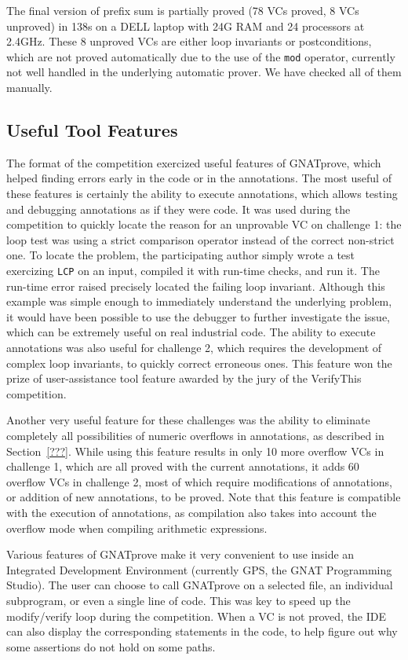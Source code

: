 \documentclass[sttt,draft]{svjour}
\newcommand{\gnatprove}{GNATprove\xspace}
\begin{document}
The final version of prefix sum is partially proved (78 VCs proved, 8 VCs
unproved) in 138s on a DELL laptop with 24G RAM and 24 processors at 2.4GHz.
These 8 unproved VCs are either loop invariants or postconditions, which are
not proved automatically due to the use of the \verb|mod| operator, currently
not well handled in the underlying automatic prover. We have checked all of
them manually.

\subsection{Useful Tool Features}

The format of the competition exercized useful features of \gnatprove, which
helped finding errors early in the code or in the annotations. The most useful
of these features is certainly the ability to execute annotations, which allows
testing and debugging annotations as if they were code. It was used during the
competition to quickly locate the reason for an unprovable VC on challenge 1:
the loop test was using a strict comparison operator instead of the correct
non-strict one. To locate the problem, the participating author simply wrote a
test exercizing \verb|LCP| on an input, compiled it with run-time checks, and
run it. The run-time error raised precisely located the failing loop
invariant. Although this example was simple enough to immediately understand
the underlying problem, it would have been possible to use the debugger to
further investigate the issue, which can be extremely useful on real industrial
code. The ability to execute annotations was also useful for challenge 2, which
requires the development of complex loop invariants, to quickly correct
erroneous ones. This feature won the prize of user-assistance tool feature
awarded by the jury of the VerifyThis competition.

Another very useful feature for these challenges was the ability to eliminate
completely all possibilities of numeric overflows in annotations, as described
in Section~\ref{???}. While using this feature results in only 10 more overflow
VCs in challenge 1, which are all proved with the current annotations, it adds
60 overflow VCs in challenge 2, most of which require modifications of
annotations, or addition of new annotations, to be proved. Note that this
feature is compatible with the execution of annotations, as compilation also
takes into account the overflow mode when compiling arithmetic expressions.

Various features of \gnatprove make it very convenient to use inside an
Integrated Development Environment (currently GPS, the GNAT Programming
Studio). The user can choose to call \gnatprove on a selected file, an
individual subprogram, or even a single line of code. This was key to speed up
the modify/verify loop during the competition. When a VC is not proved, the IDE
can also display the corresponding statements in the code, to help figure out
why some assertions do not hold on some paths.
\end{document}
